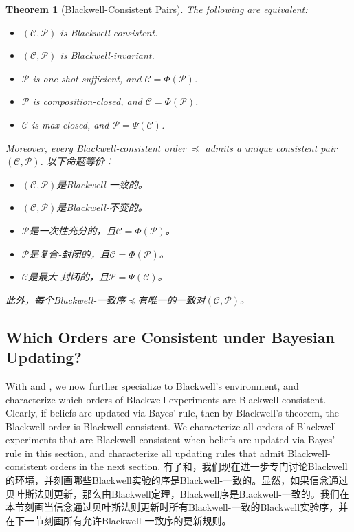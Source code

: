 \documentclass[12pt,letterpaper]{article}
\newenvironment{original}{\color{black}}{}
\newenvironment{translation}{\color{blue}}{}
\theoremstyle{plain}
\newtheorem{theorem}{Theorem}
\theoremstyle{definition}
\theoremstyle{remark}
\newcommand{\Pc}{\mathcal{P}}
\newcommand{\C}{\mathcal{C}}
\theoremstyle{definition}
\begin{document}
\begin{theorem}[Blackwell-Consistent Pairs]\label{thm:main-compare}
\begin{original}
The following are equivalent:
\begin{itemize}
    \item[(a)] $(\C, \Pc)$ is Blackwell-consistent.
    \item[(b)] $(\C, \Pc)$ is Blackwell-invariant.
    \item[(c)] $\Pc$ is one-shot sufficient, and $\C = \Phi(\Pc)$.
    \item[(d)] $\Pc$ is composition-closed, and $\C = \Phi(\Pc)$.
    \item[(e)] $\mathcal{C}$ is max-closed, and $\mathcal{P} = \Psi(\C)$.
    \end{itemize}
Moreover, every Blackwell-consistent order $\preceq$ admits a unique consistent pair $(\C, \Pc)$.
\end{original}
\begin{translation}
以下命题等价：
\begin{itemize}
    \item[(a)] $(\C, \Pc)$是Blackwell-一致的。
    \item[(b)] $(\C, \Pc)$是Blackwell-不变的。
    \item[(c)] $\Pc$是一次性充分的，且$\C = \Phi(\Pc)$。
    \item[(d)] $\Pc$是复合-封闭的，且$\C = \Phi(\Pc)$。
    \item[(e)] $\mathcal{C}$是最大-封闭的，且$\mathcal{P} = \Psi(\C)$。
    \end{itemize}
此外，每个Blackwell-一致序$\preceq$有唯一的一致对$(\C, \Pc)$。
\end{translation}
\end{theorem}


\subsection{Which Orders are Consistent under Bayesian Updating?}\label{sec:Bayes-plausible}
\begin{original}
With  and ,  we now further specialize to Blackwell's environment, and characterize which orders of Blackwell experiments are Blackwell-consistent. Clearly, if beliefs are updated via Bayes' rule, then by Blackwell's theorem, the Blackwell order is Blackwell-consistent. We characterize all orders of Blackwell experiments that are Blackwell-consistent when beliefs are updated via Bayes' rule in this section, and characterize all updating rules that admit Blackwell-consistent orders in the next section.
\end{original}
\begin{translation}
有了和，我们现在进一步专门讨论Blackwell的环境，并刻画哪些Blackwell实验的序是Blackwell-一致的。显然，如果信念通过贝叶斯法则更新，那么由Blackwell定理，Blackwell序是Blackwell-一致的。我们在本节刻画当信念通过贝叶斯法则更新时所有Blackwell-一致的Blackwell实验序，并在下一节刻画所有允许Blackwell-一致序的更新规则。
\end{translation}
\end{document}
